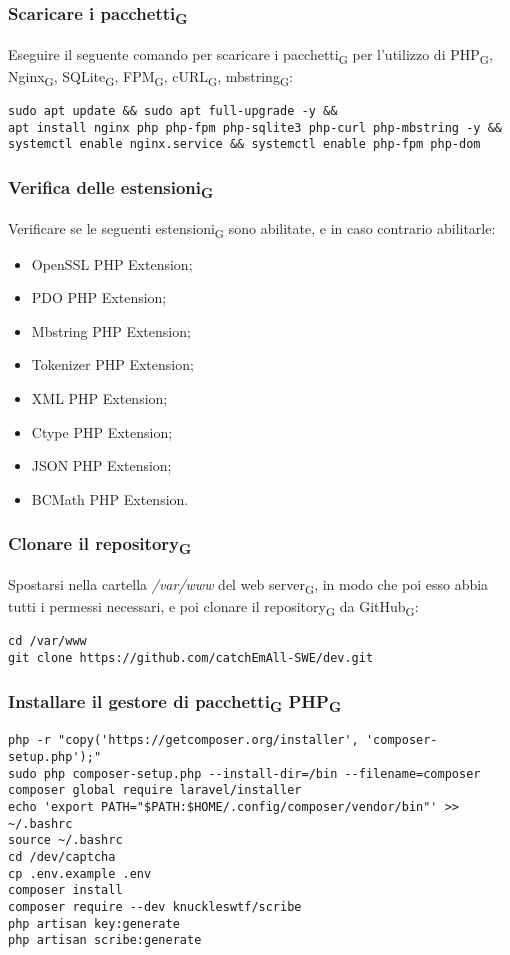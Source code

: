 \subsubsection{Scaricare i pacchetti\textsubscript{G}}
Eseguire il seguente comando per scaricare i pacchetti\textsubscript{G} per l'utilizzo di PHP\textsubscript{G}, Nginx\textsubscript{G}, SQLite\textsubscript{G}, FPM\textsubscript{G}, cURL\textsubscript{G}, mbstring\textsubscript{G}:
\begin{verbatim}
sudo apt update && sudo apt full-upgrade -y && 
apt install nginx php php-fpm php-sqlite3 php-curl php-mbstring -y && 
systemctl enable nginx.service && systemctl enable php-fpm php-dom
\end{verbatim}

\subsubsection{Verifica delle estensioni\textsubscript{G}}
Verificare se le seguenti estensioni\textsubscript{G} sono abilitate, e in caso contrario abilitarle:
\begin{itemize}
	\item OpenSSL PHP Extension;
	\item PDO PHP Extension;
 \item Mbstring PHP Extension;
 \item Tokenizer PHP Extension;
 \item XML PHP Extension;
 \item Ctype PHP Extension;
 \item JSON PHP Extension;
 \item BCMath PHP Extension.
\end{itemize}   

\subsubsection{Clonare il repository\textsubscript{G}}
Spostarsi nella cartella \textit{/var/www} del web server\textsubscript{G}, in modo che poi esso abbia tutti i permessi necessari, e poi clonare il repository\textsubscript{G} da GitHub\textsubscript{G}:
\begin{verbatim}
cd /var/www
git clone https://github.com/catchEmAll-SWE/dev.git
\end{verbatim}

\subsubsection{Installare il gestore di pacchetti\textsubscript{G} PHP\textsubscript{G}}
\begin{verbatim}
php -r "copy('https://getcomposer.org/installer', 'composer-setup.php');"
sudo php composer-setup.php --install-dir=/bin --filename=composer
composer global require laravel/installer
echo 'export PATH="$PATH:$HOME/.config/composer/vendor/bin"' >> ~/.bashrc
source ~/.bashrc
cd /dev/captcha
cp .env.example .env
composer install
composer require --dev knuckleswtf/scribe
php artisan key:generate
php artisan scribe:generate
\end{verbatim}

